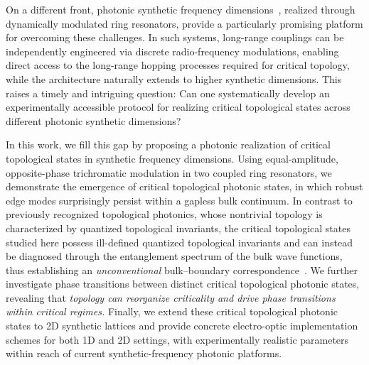 \documentclass[aps,prl,twocolumn,preprintnumbers,amsmath,amssymb,superscriptaddress,10pt]{revtex4-2}
\begin{document}
On a different front, photonic synthetic frequency dimensions~\cite{yu2025comprehensive,Yuan2018,OzawaPrice2019,Dutt2019,dutt2022creating,Yuan2021Review,yuan2016photonic,daweiwang2022Light,wang2025versatile,zeng2026hybrid,li2023direct,PhysRevLett.132.183802,leefmans2022topological}, realized through dynamically modulated ring resonators, provide a particularly promising platform for overcoming these challenges. In such systems, long-range couplings can be independently engineered via discrete radio-frequency modulations, enabling direct access to the long-range hopping processes required for critical topology, while the architecture naturally extends to higher synthetic dimensions. This raises a timely and intriguing question: Can one systematically develop an experimentally accessible protocol for realizing critical topological states across different photonic synthetic dimensions?

In this work, we fill this gap by proposing a photonic realization of critical topological states in synthetic frequency dimensions. Using equal-amplitude, opposite-phase trichromatic modulation in two coupled ring resonators, we demonstrate the emergence of critical topological photonic states, in which robust edge modes surprisingly persist within a gapless bulk continuum. In contrast to previously recognized topological photonics, whose nontrivial topology is characterized by quantized topological invariants, the critical topological states studied here possess ill-defined quantized topological invariants and can instead be diagnosed through the entanglement spectrum of the bulk wave functions, thus establishing an \textit{unconventional} bulk–boundary correspondence~\cite{PhysRevLett.101.010504,PhysRevLett.113.106801,PhysRevLett.113.060501,PhysRevB.84.205136,guo2025generalized}. We further investigate phase transitions between distinct critical topological photonic states, revealing that \textit{topology can reorganize criticality and drive phase transitions within critical regimes.} Finally, we extend these critical topological photonic states to 2D synthetic lattices and provide concrete electro-optic implementation schemes for both 1D and 2D settings, with experimentally realistic parameters within reach of current synthetic-frequency photonic platforms.
\end{document}
